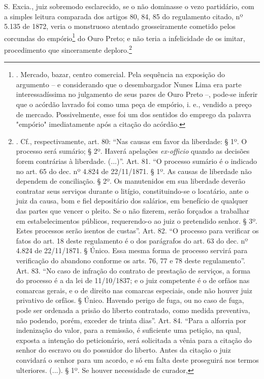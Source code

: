 S. Excia., juiz sobremodo esclarecido, se o não dominasse o vezo
partidário, com a simples leitura comparada dos artigos 80, 84, 85 do
regulamento citado, nº 5.135 de 1872, veria o monstruoso atentado
grosseiramente cometido pelos corcundas do empório\footnote{. Mercado,
  bazar, centro comercial. Pela sequência na exposição do argumento -- e
  considerando que o desembargador Nunes Lima era parte interessadíssima
  no julgamento de seus pares de Ouro Preto --, pode-se inferir que o
  acórdão lavrado foi como uma peça de empório, i. e., vendido a preço
  de mercado. Possivelmente, esse foi um dos sentidos do emprego da
  palavra "empório" imediatamente após a citação do acórdão.} do Ouro
Preto; e não teria a infelicidade de os imitar, procedimento que
sinceramente deploro.\footnote{. Cf., respectivamente, art. 80: ``Nas
  causas em favor da liberdade: § 1º. O processo será sumário; § 2º.
  Haverá apelações \emph{ex-officio} quando as decisões forem contrárias
  à liberdade. (...)''. Art. 81. ``O processo sumário é o indicado no
  art. 65 do dec. nº 4.824 de 22/11/1871. § 1º. As causas de liberdade
  não dependem de conciliação. § 2º. Os manutenidos em sua liberdade
  deverão contratar seus serviços durante o litígio, constituindo-se o
  locatário, ante o juiz da causa, bom e fiel depositário dos salários,
  em benefício de qualquer das partes que vencer o pleito. Se o não
  fizerem, serão forçados a trabalhar em estabelecimentos públicos,
  requerendo-o ao juiz o pretendido senhor. § 3º. Estes processos serão
  isentos de custas''. Art. 82. ``O processo para verificar os fatos do
  art. 18 deste regulamento é o dos parágrafos do art. 63 do dec. nº
  4.824 de 22/11/1871. § Único. Essa mesma forma de processo servirá
  para verificação do abandono conforme os arts. 76, 77 e 78 deste
  regulamento''. Art. 83. ``No caso de infração do contrato de prestação
  de serviços, a forma do processo é a da lei de 11/10/1837; e o juiz
  competente é o de orfãos nas comarcas gerais, e o de direito nas
  comarcas especiais, onde não houver juiz privativo de orfãos. § Único.
  Havendo perigo de fuga, ou no caso de fuga, pode ser ordenada a prisão
  do liberto contratado, como medida preventiva, não podendo, porém,
  exceder de trinta dias''. Art. 84. ``Para a alforria por indenização
  do valor, para a remissão, é suficiente uma petição, na qual, exposta
  a intenção do peticionário, será solicitada a vênia para a citação do
  senhor do escravo ou do possuidor do liberto. Antes da citação o juiz
  convidará o senhor para um acordo, e só em falta deste proseguirá nos
  termos ulteriores. (...). § 1º. Se houver necessidade de curador,
}
